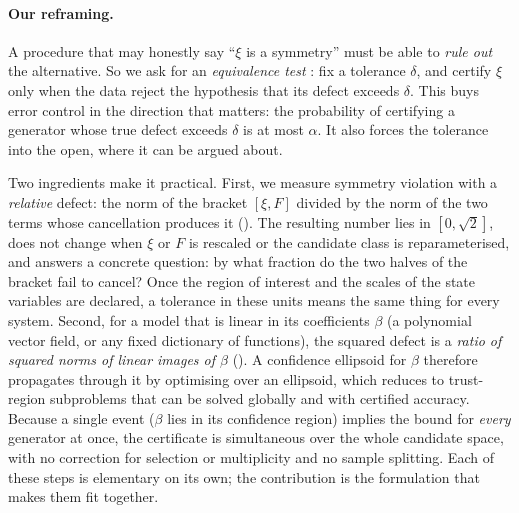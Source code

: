\paragraph{Our reframing.} A procedure that may honestly say ``$\xi$ is a
symmetry'' must be able to \emph{rule out} the alternative. So we ask for an
\emph{equivalence test}
\citep{schuirmann1987comparison,berger1996bioequivalence, wellek2010testing}:
fix a tolerance $\delta$, and certify $\xi$ only when the data reject the
hypothesis that its defect exceeds $\delta$. This buys error control in the
direction that matters: the probability of certifying a generator whose true
defect exceeds $\delta$ is at most $\alpha$. It also forces the tolerance into
the open, where it can be argued about.

Two ingredients make it practical. First, we measure symmetry violation with a
\emph{relative} defect: the norm of the bracket $[\xi,F]$ divided by the norm
of the two terms whose cancellation produces it (). The
resulting number lies in $[0,\sqrt 2]$, does not change when $\xi$ or $F$ is
rescaled or the candidate class is reparameterised, and answers a concrete
question: by what fraction do the two halves of the bracket fail to cancel?
Once the region of interest and the scales of the state variables are declared,
a tolerance in these units means the same thing for every system. Second, for
a model that is linear in its coefficients $\beta$ (a polynomial vector field,
or any fixed dictionary of functions), the squared defect is a \emph{ratio of
squared norms of linear images of $\beta$} (). A confidence
ellipsoid for $\beta$ therefore propagates through it by optimising over an
ellipsoid, which reduces to trust-region subproblems
\citep{gander1989constrained,more1983computing} that can be solved globally and
with certified accuracy. Because a single event ($\beta$ lies in its
confidence region) implies the bound for \emph{every} generator at once, the
certificate is simultaneous over the whole candidate space, with no correction
for selection or multiplicity and no sample splitting. Each of these steps is
elementary on its own; the contribution is the formulation that makes them fit
together.

